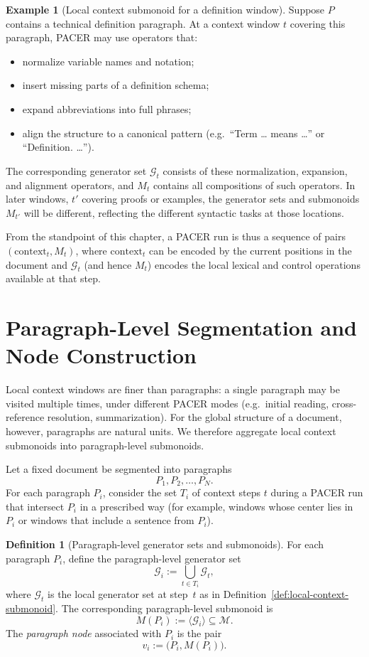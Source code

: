 \documentclass[11pt]{book}
\theoremstyle{plain}
\theoremstyle{definition}
\newtheorem{definition}[theorem]{Definition}
\newtheorem{example}[theorem]{Example}
\theoremstyle{remark}
\begin{document}
\begin{example}[Local context submonoid for a definition window]
\label{ex:local-definition-window}
Suppose $P$ contains a technical definition paragraph. At a context
window $t$ covering this paragraph, PACER may use operators that:
\begin{itemize}
  \item normalize variable names and notation;
  \item insert missing parts of a definition schema;
  \item expand abbreviations into full phrases;
  \item align the structure to a canonical pattern (e.g.\ ``Term \dots
        means \dots'' or ``Definition. \dots'').
\end{itemize}
The corresponding generator set $\mathcal{G}_t$ consists of these
normalization, expansion, and alignment operators, and $M_t$ contains
all compositions of such operators. In later windows, $t'$ covering
proofs or examples, the generator sets and submonoids $M_{t'}$ will
be different, reflecting the different syntactic tasks at those
locations.
\end{example}

From the standpoint of this chapter, a PACER run is thus a sequence of
pairs $(\text{context}_t, M_t)$, where $\text{context}_t$ can be
encoded by the current positions in the document and $\mathcal{G}_t$
(and hence $M_t$) encodes the local lexical and control operations
available at that step.

\section{Paragraph-Level Segmentation and Node Construction}


Local context windows are finer than paragraphs: a single paragraph may
be visited multiple times, under different PACER modes (e.g.\ initial
reading, cross-reference resolution, summarization). For the global
structure of a document, however, paragraphs are natural units. We
therefore aggregate local context submonoids into paragraph-level
submonoids.

Let a fixed document be segmented into paragraphs
\[
  P_1, P_2,\dots, P_N.
\]
For each paragraph $P_i$, consider the set $T_i$ of context steps $t$
during a PACER run that intersect $P_i$ in a prescribed way (for
example, windows whose center lies in $P_i$ or windows that include a
sentence from $P_i$).

\begin{definition}[Paragraph-level generator sets and submonoids]
\label{def:paragraph-submonoids}
For each paragraph $P_i$, define the paragraph-level generator set
\[
  \mathcal{G}_i
  :=
  \bigcup_{t\in T_i}\mathcal{G}_t,
\]
where $\mathcal{G}_t$ is the local generator set at step~$t$ as in
Definition~\ref{def:local-context-submonoid}. The corresponding
paragraph-level submonoid is
\[
  M(P_i)
  :=
  \langle \mathcal{G}_i\rangle
  \subseteq\mathcal{M}.
\]
The \emph{paragraph node} associated with $P_i$ is the pair
\[
  v_i
  :=
  \bigl(P_i, M(P_i)\bigr).
\]
\end{definition}
\end{document}
